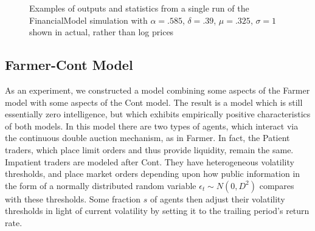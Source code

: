 \documentclass[runningheads]{llncs}
\begin{document}
\begin{figure}[htbp]
\begin{center}
{
      }
    \caption{Examples of outputs and statistics from a single run of the FinancialModel simulation with $\alpha=.585$, $\delta=.39$, $\mu=.325$, $\sigma=1$ shown in actual, rather than log prices}
    \label{fig:dynamicsFarmerNonLog}
  \end{center}
\end{figure}


\subsection{Farmer-Cont Model}

As an experiment, we constructed a model combining some aspects of the Farmer model with some aspects of the Cont model. The result is a model which is still essentially zero intelligence, but which exhibits empirically positive characteristics of both models. In this model there are two types of agents, which interact via the continuous double auction mechanism, as in Farmer. In fact, the Patient traders, which place limit orders and thus provide liquidity, remain the same. Impatient traders are modeled after Cont. They have heterogeneous volatility thresholds, and place market orders depending upon how public information in the form of a normally distributed random variable $\epsilon_t \sim N(0,D^2)$ compares with these thresholds. Some fraction $s$ of agents then adjust their volatility thresholds in light of current volatility by setting it to the trailing period's return rate.
\end{document}
